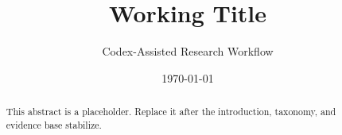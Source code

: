 \documentclass[11pt]{article}
\title{Working Title}
\author{Codex-Assisted Research Workflow}
\date{\today}
\begin{document}
\maketitle

\begin{abstract}
This abstract is a placeholder. Replace it after the introduction, taxonomy, and evidence base stabilize.
\end{abstract}












\end{document}
